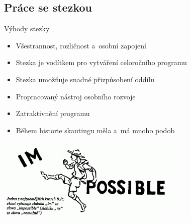 \documentclass[compress, ucs, xelatex, xcolor=dvipsnames, print,
  hyperref={
    bookmarks=true,
    unicode=true,
    colorlinks=true,
    plainpages=false,
    pdfkeywords={Junak, Pedagogika, Skaut, Skauting, Vychovna metoda},
    linkcolor=Black,
    anchorcolor=Black,
    citecolor=OliveGreen,
    filecolor=OliveGreen,
    menucolor=Black,
    urlcolor=OliveGreen,
    pdftex}
  ]{beamer}
\begin{document}
\subsection{Práce se stezkou}

\begin{frame}{Výhody stezky}
  \begin{itemize}
    \item Všestrannost, rozličnost a~osobní zapojení
    \item Stezka je vodítkem pro vytváření celoročního programu
    \item Stezka umožňuje snadné přizpůsobení oddílu
    \item Propracovaný nástroj osobního rozvoje
    \item Zatraktivnění programu
    \item Během historie skautingu měla a~má mnoho podob
  \end{itemize}
  \begin{center}
    \includegraphics[height=4cm]{im-possible_m.png}
  \end{center}
\end{frame}
\end{document}
